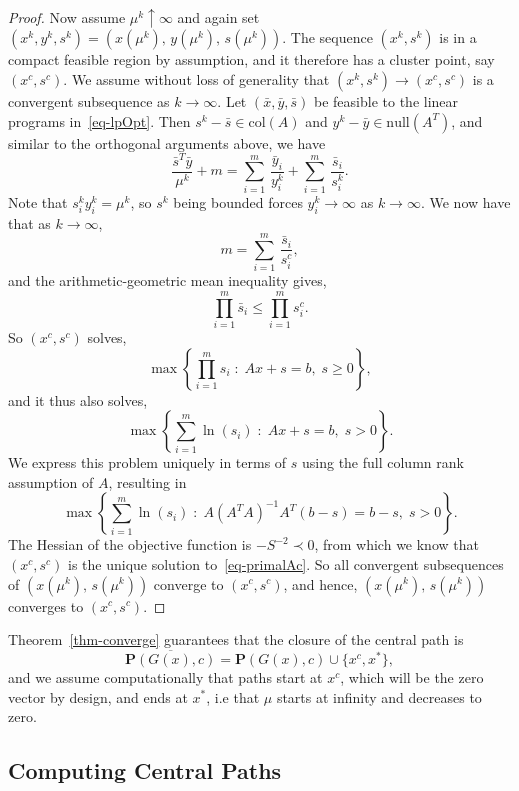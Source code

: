 \documentclass{article}
\def\bP{\mathbf{P}}
\def\nd{\prec}
\def\xb{\bar{x}}
\def\yb{\bar{y}}
\def\sb{\bar{s}}
\begin{document}
\begin{proof}
Now assume $\mu^k \uparrow \infty$ and again set 
$(x^k, y^k, s^k) = (x(\mu^k), \, y(\mu^k), \, s(\mu^k) )$.
The sequence $(x^k, s^k)$ is in a compact feasible region by assumption,
and it therefore has a cluster point, say $(x^c, s^c)$. We assume without
loss of generality that $(x^k, s^k) \rightarrow (x^c, s^c)$ is a convergent
subsequence as $k \rightarrow \infty$. Let $(\xb, \yb, \sb)$ be feasible 
to the linear programs in~\eqref{eq-lpOpt}. Then $s^k - \sb \in \mbox{col}(A)$ 
and $y^k - \yb \in \mbox{null}(A^T)$, and similar to the orthogonal 
arguments above, we have
\[
\frac{\sb^T \yb}{\mu^k} + m = 
    \sum_{i=1}^m \, \frac{\yb_i}{y^k_i} + 
    \sum_{i=1}^m \, \frac{\sb_i}{s^k_i}.
\]
Note that $s^k_i y^k_i = \mu^k$, so $s^k$ being bounded forces
$y^k_i \rightarrow \infty$ as $k \rightarrow \infty$. We now have that as
$k \rightarrow \infty$,
\[
m = \sum_{i=1}^m \, \frac{\sb_i}{s^c_i},
\]
and the arithmetic-geometric mean inequality gives,
\[
\prod_{i=1}^m \sb_i \le \prod_{i=1}^m s^c_i.
\]
So $(x^c, s^c)$ solves,
\[
\max \left\{ \prod_{i=1}^m s_i \; : \; Ax + s = b, \; s \ge 0 \right\},
\]
and it thus also solves,
\[
\max \left\{ \sum_{i=1}^m \ln(s_i) \; : \; Ax + s = b, \; s > 0 \right\}.
\]
We express this problem uniquely in terms of $s$ using the full column rank 
assumption of $A$, resulting in
\[
\max \left\{ \sum_{i=1}^m \ln(s_i) \; : \; A(A^TA)^{-1}A^T(b-s) = b-s, \; s > 0 \right\}.
\]
The Hessian of the objective function is $-S^{-2} \nd 0$, from 
which we know that $(x^c, s^c)$ is the unique solution 
to~\eqref{eq-primalAc}. So all convergent subsequences of
$(x(\mu^k), \, s(\mu^k) )$ converge to $(x^c, s^c)$, and hence,
$(x(\mu^k), \, s(\mu^k) )$ converges to $(x^c, s^c)$. 
\end{proof}
\noindent Theorem~\ref{thm-converge} guarantees that the closure of the 
central path is
\[
\overline{\bP(G(x), c)} = \bP(G(x), c) \cup \{ x^c, x^*\},
\]
and we assume computationally that paths start at $x^c$, which will be the zero vector by 
design, and ends at $x^*$, i.e that $\mu$ starts at infinity and decreases
to zero.

\subsection{Computing Central Paths} \label{subsec-computingCP}
\end{document}
